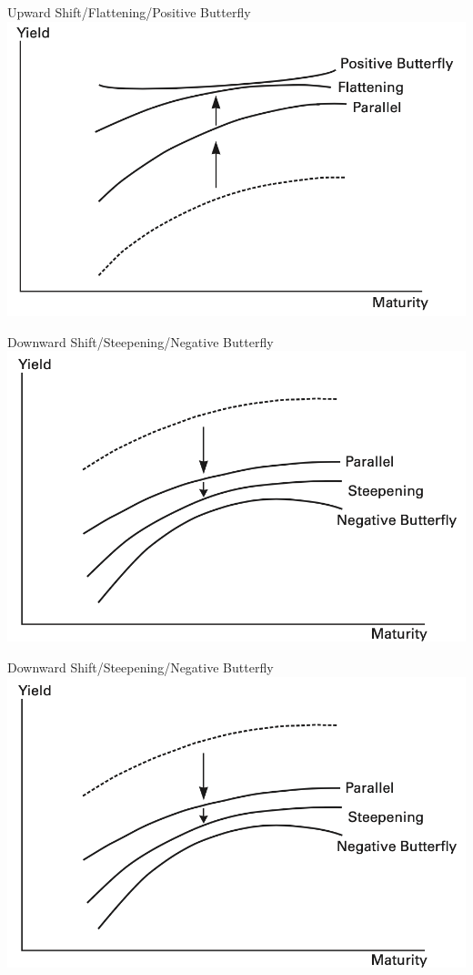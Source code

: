 \documentclass[10pt,a4paper]{beamer}
\begin{document}
\begin{frame}{Upward Shift/Flattening/Positive Butterfly}
\includegraphics[scale=0.7]{7}
\end{frame}


\begin{frame}{Downward Shift/Steepening/Negative Butterfly}
\includegraphics[scale=0.7]{8}
\end{frame}





\begin{frame}{Downward Shift/Steepening/Negative Butterfly}
\includegraphics[scale=0.7]{8}
\end{frame}
\end{document}
